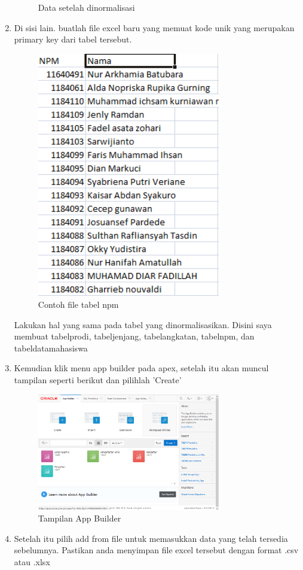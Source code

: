 \begin{enumerate}
\begin{figure}[H]
				\centering
				\caption{Data setelah dinormalisasi}
				\end{figure}
	\item Di sisi lain. buatlah file excel baru yang memuat kode unik yang merupakan primary key dari tabel tersebut.
				\begin{figure}[H]
				\includegraphics[width=8cm]{figures/npm.png}
				\centering
				\caption{Contoh file tabel npm}
				\end{figure}
			Lakukan hal yang sama pada tabel yang dinormalisasikan. Disini saya membuat tabelprodi, tabeljenjang, tabelangkatan, tabelnpm, dan tabeldatamahasiswa
	\item Kemudian klik menu app builder pada apex, setelah itu akan muncul tampilan seperti berikut dan pilihlah 'Create'
				\begin{figure}[H]
				\includegraphics[width=8cm]{figures/5.png}
				\centering
				\caption{Tampilan App Builder}
				\end{figure}
	\item Setelah itu pilih add from file untuk memasukkan data yang telah tersedia sebelumnya. Pastikan anda menyimpan file excel tersebut dengan format .csv atau .xlsx

\end{enumerate}

